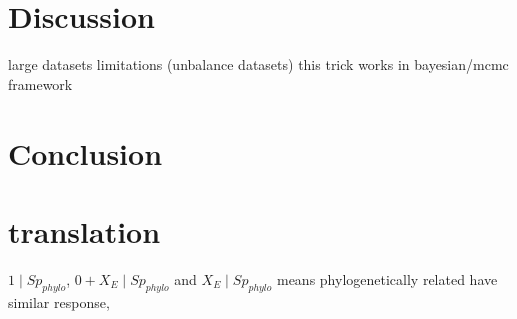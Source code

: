 
\newpage

\section{Discussion}

large datasets
limitations (unbalance datasets)
this trick works in bayesian/mcmc framework


\newpage

\section{Conclusion}

\newpage

\section{translation}

$1 \mid Sp_{phylo}$, $0 + X_{E} \mid Sp_{phylo}$ and $X_{E} \mid Sp_{phylo}$ means phylogenetically related have similar response,   

